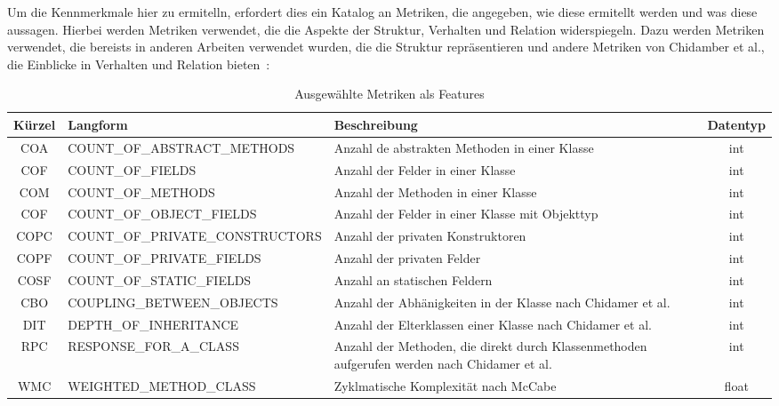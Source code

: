 Um die Kennmerkmale hier zu ermitelln, erfordert dies ein Katalog an Metriken, die angegeben, wie diese ermitellt werden und was diese aussagen. Hierbei werden Metriken verwendet, die die Aspekte der Struktur, Verhalten und Relation widerspiegeln.
Dazu werden Metriken verwendet, die bereists in anderen Arbeiten verwendet wurden, die die Struktur repräsentieren und andere Metriken von Chidamber et al., die Einblicke in Verhalten und Relation bieten~\cite{chidamber1994metrics}:


\begin{table}[H]
    \begin{tabular}{|c|p{0,45\linewidth}|p{0,35\linewidth}|c|}
        \hline
        Kürzel & Langform &Beschreibung & Datentyp\\
        \hline
        COA & COUNT\_OF\_ABSTRACT\_METHODS & Anzahl de abstrakten Methoden in einer Klasse & int\\
        COF & COUNT\_OF\_FIELDS & Anzahl der Felder in einer Klasse & int\\
        COM & COUNT\_OF\_METHODS & Anzahl der Methoden in einer Klasse & int\\
        COF & COUNT\_OF\_OBJECT\_FIELDS &Anzahl der Felder in einer Klasse mit Objekttyp & int\\
        COPC & COUNT\_OF\_PRIVATE\_CONSTRUCTORS & Anzahl der privaten Konstruktoren & int\\
        COPF & COUNT\_OF\_PRIVATE\_FIELDS & Anzahl der privaten Felder & int\\
        COSF & COUNT\_OF\_STATIC\_FIELDS & Anzahl an statischen Feldern & int\\
        CBO & COUPLING\_BETWEEN\_OBJECTS & Anzahl der Abhänigkeiten in der Klasse nach Chidamer et al. & int\\
        DIT & DEPTH\_OF\_INHERITANCE & Anzahl der Elterklassen einer Klasse nach Chidamer et al. & int\\
        RPC & RESPONSE\_FOR\_A\_CLASS & Anzahl der Methoden, die direkt durch Klassenmethoden aufgerufen werden nach Chidamer et al. & int\\
        WMC & WEIGHTED\_METHOD\_CLASS & Zyklmatische Komplexität nach McCabe~\cite{mccabe1976complexity} & float\\
        \hline
    \end{tabular}
    \caption{Ausgewählte Metriken als Features}
\end{table}

